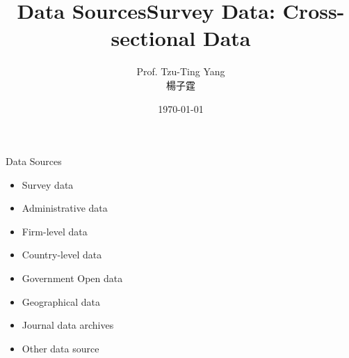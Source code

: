 \documentclass[hyperref={pdfpagelabels=false}]{beamer}
\title[]  
{Data Sources}
\author 
 {Prof. Tzu-Ting Yang  \\ 楊子霆}
\institute{Institute of Economics, Academia Sinica  \\ 中央研究院經濟研究所}
\date
 {\today}
\begin{document}
	
	
	\begin{frame}{}
	\titlepage
\end{frame}





\begin{frame}{Data Sources}
\begin{itemize} 
	\item Survey data
	\vspace{0.3cm}
	\item Administrative data
	\vspace{0.3cm}
	\item Firm-level data
	\vspace{0.3cm}
	\item Country-level data
	\vspace{0.3cm}
	\item Government Open data
	\vspace{0.3cm}
	\item Geographical data
	\vspace{0.3cm}
	\item Journal data archives
	\vspace{0.3cm}
	\item Other data source
	
\end{itemize}
\end{frame}






\title[]  
{Survey Data: Cross-sectional Data}


\author 
{}

\institute{}






\date
{}


\begin{frame}{}
	\titlepage
\end{frame}
\end{document}
